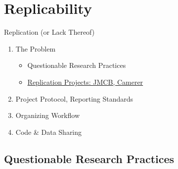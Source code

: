 \documentclass{beamer}
\begin{document}
\section{Replicability}
\begin{frame}{Replication (or Lack Thereof)}
\begin{enumerate}[<.->]
 \item The Problem	
 	\begin{itemize}
 	\item Questionable Research Practices
 	\item \href{http://www.jstor.org/stable/1806061}{Replication Projects: JMCB, Camerer}
	\end{itemize}
 \item Project Protocol, Reporting Standards
 \item Organizing Workflow
 \item Code \& Data Sharing
\end{enumerate}
\end{frame}

\subsection*{Questionable Research Practices}




\end{document}
